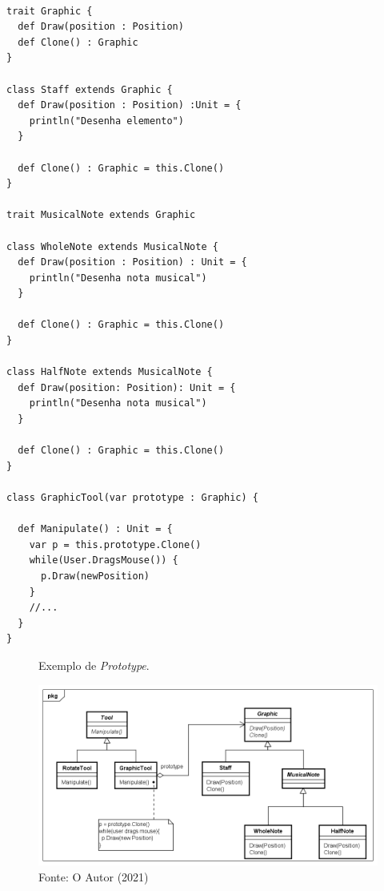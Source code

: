 \begin{lstlisting}[caption={\textit{Prototype} Orientado a Objetos.},label=ooprototype]

trait Graphic {
  def Draw(position : Position)
  def Clone() : Graphic
}

class Staff extends Graphic {
  def Draw(position : Position) :Unit = {
    println("Desenha elemento")
  }

  def Clone() : Graphic = this.Clone()
}

trait MusicalNote extends Graphic

class WholeNote extends MusicalNote {
  def Draw(position : Position) : Unit = {
    println("Desenha nota musical")
  }

  def Clone() : Graphic = this.Clone()
}

class HalfNote extends MusicalNote {
  def Draw(position: Position): Unit = {
    println("Desenha nota musical")
  }

  def Clone() : Graphic = this.Clone()
}

class GraphicTool(var prototype : Graphic) {

  def Manipulate() : Unit = {
    var p = this.prototype.Clone()
    while(User.DragsMouse()) {
      p.Draw(newPosition)
    }
    //...
  }
}

\end{lstlisting}

\begin{figure}[htb]
	\caption{\label{prototype_exemplo}Exemplo de \textit{Prototype}.}
	\begin{center}
	    \includegraphics[scale=0.5]{5_padroes-contexto-funcional/5.1_criacionais/5.1.4_prototype/prototype_exemplo.png}
	\end{center}
  \caption*{Fonte: O Autor (2021)}
\end{figure}

